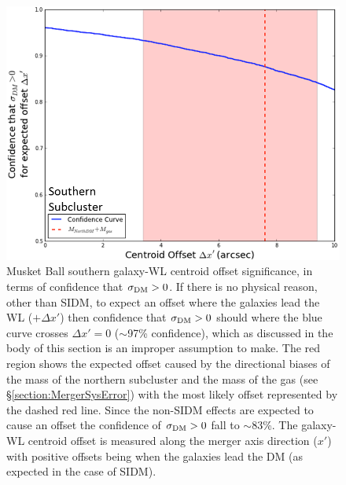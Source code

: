 \begin{figure}
\centering
\includegraphics[width=5in]{Chapter4/AnalysisFiles/GalDenVsHSTWL_pzpen_delxPC_south_reformat.png}
\caption[Musket Ball southern subcluster galaxy and weak lensing centroid offset significance.]{
Musket Ball southern galaxy-WL centroid offset significance, in terms of confidence that $\sigma_{\rm DM}>0$.
If there is no physical reason, other than SIDM, to expect an offset where the galaxies lead the WL ($+\Delta x'$) then confidence that $\sigma_{\rm DM}>0$ should where the blue curve crosses $\Delta x'=0$ ($\sim$97\% confidence), which as discussed in the body of this section is an improper assumption to make.
The red region shows the expected offset caused by the directional biases of the mass of the northern subcluster and the mass of the gas (see \S\ref{section:MergerSysError}) with the most likely offset represented by the dashed red line.
Since the non-SIDM effects are expected to cause an offset the confidence of $\sigma_{\rm DM}>0$ fall to $\sim$83\%.
The galaxy-WL centroid offset is measured along the merger axis direction ($x'$) with positive offsets being when the galaxies lead the DM (as expected in the case of SIDM).
}
\label{figure:CentroidSignificance_South}
\end{figure}

